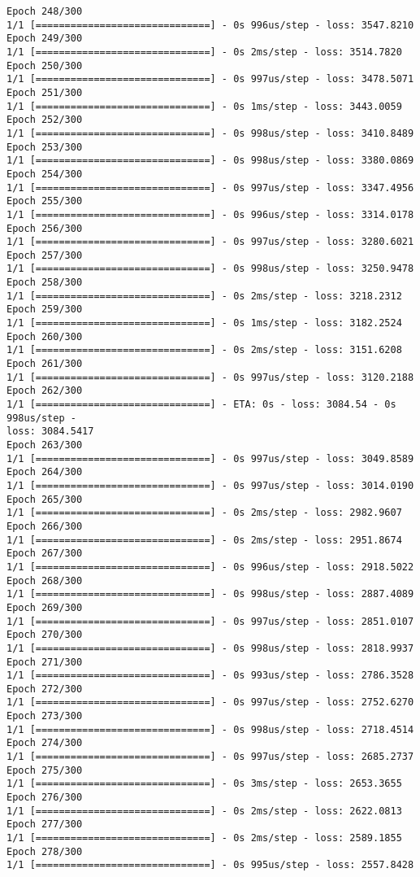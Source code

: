 \documentclass[11pt]{article}
\begin{document}
\begin{Verbatim}[commandchars=\\\{\}]
Epoch 248/300
1/1 [==============================] - 0s 996us/step - loss: 3547.8210
Epoch 249/300
1/1 [==============================] - 0s 2ms/step - loss: 3514.7820
Epoch 250/300
1/1 [==============================] - 0s 997us/step - loss: 3478.5071
Epoch 251/300
1/1 [==============================] - 0s 1ms/step - loss: 3443.0059
Epoch 252/300
1/1 [==============================] - 0s 998us/step - loss: 3410.8489
Epoch 253/300
1/1 [==============================] - 0s 998us/step - loss: 3380.0869
Epoch 254/300
1/1 [==============================] - 0s 997us/step - loss: 3347.4956
Epoch 255/300
1/1 [==============================] - 0s 996us/step - loss: 3314.0178
Epoch 256/300
1/1 [==============================] - 0s 997us/step - loss: 3280.6021
Epoch 257/300
1/1 [==============================] - 0s 998us/step - loss: 3250.9478
Epoch 258/300
1/1 [==============================] - 0s 2ms/step - loss: 3218.2312
Epoch 259/300
1/1 [==============================] - 0s 1ms/step - loss: 3182.2524
Epoch 260/300
1/1 [==============================] - 0s 2ms/step - loss: 3151.6208
Epoch 261/300
1/1 [==============================] - 0s 997us/step - loss: 3120.2188
Epoch 262/300
1/1 [==============================] - ETA: 0s - loss: 3084.54 - 0s 998us/step -
loss: 3084.5417
Epoch 263/300
1/1 [==============================] - 0s 997us/step - loss: 3049.8589
Epoch 264/300
1/1 [==============================] - 0s 997us/step - loss: 3014.0190
Epoch 265/300
1/1 [==============================] - 0s 2ms/step - loss: 2982.9607
Epoch 266/300
1/1 [==============================] - 0s 2ms/step - loss: 2951.8674
Epoch 267/300
1/1 [==============================] - 0s 996us/step - loss: 2918.5022
Epoch 268/300
1/1 [==============================] - 0s 998us/step - loss: 2887.4089
Epoch 269/300
1/1 [==============================] - 0s 997us/step - loss: 2851.0107
Epoch 270/300
1/1 [==============================] - 0s 998us/step - loss: 2818.9937
Epoch 271/300
1/1 [==============================] - 0s 993us/step - loss: 2786.3528
Epoch 272/300
1/1 [==============================] - 0s 997us/step - loss: 2752.6270
Epoch 273/300
1/1 [==============================] - 0s 998us/step - loss: 2718.4514
Epoch 274/300
1/1 [==============================] - 0s 997us/step - loss: 2685.2737
Epoch 275/300
1/1 [==============================] - 0s 3ms/step - loss: 2653.3655
Epoch 276/300
1/1 [==============================] - 0s 2ms/step - loss: 2622.0813
Epoch 277/300
1/1 [==============================] - 0s 2ms/step - loss: 2589.1855
Epoch 278/300
1/1 [==============================] - 0s 995us/step - loss: 2557.8428

\end{Verbatim}
\end{document}
